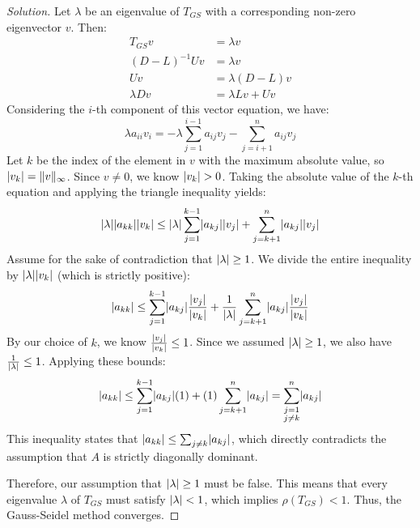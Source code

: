 \documentclass[11pt, a4paper]{article}
\DeclarePairedDelimiter\abs{\lvert}{\rvert}
\DeclarePairedDelimiter\norm{\lVert}{\rVert}
\newif\ifsolutionnewpage
\newenvironment{solution}
  {\begin{proof}[Solution]}
  {\end{proof}\ifsolutionnewpage\newpage\fi}
\begin{document}
\begin{solution}
    Let $\lambda$ be an eigenvalue of $T_{GS}$ with a corresponding non-zero eigenvector $v$. Then:
    \begin{align*}
        T_{GS} v &= \lambda v \\
        (D-L)^{-1}U v &= \lambda v \\
        U v &= \lambda(D-L) v \\
        \lambda D v &= \lambda L v + U v
    \end{align*}
    Considering the $i$-th component of this vector equation, we have:
    \[
    \lambda a_{ii} v_i = -\lambda \sum_{j=1}^{i-1} a_{ij} v_j - \sum_{j=i+1}^n a_{ij} v_j
    \]
    Let $k$ be the index of the element in $v$ with the maximum absolute value, so $\abs{v_k} = \norm{v}_\infty$. Since $v \neq 0$, we know $\abs{v_k} > 0$. Taking the absolute value of the $k$-th equation and applying the triangle inequality yields:
    \[
    \abs{\lambda} \abs{a_{kk}} \abs{v_k} \le \abs{\lambda} \sum_{j=1}^{k-1} \abs{a_{kj}} \abs{v_j} + \sum_{j=k+1}^n \abs{a_{kj}} \abs{v_j}
    \]
    Assume for the sake of contradiction that $\abs{\lambda} \ge 1$. We divide the entire inequality by $\abs{\lambda} \abs{v_k}$ (which is strictly positive):
    \[
    \abs{a_{kk}} \le \sum_{j=1}^{k-1} \abs{a_{kj}} \frac{\abs{v_j}}{\abs{v_k}} + \frac{1}{\abs{\lambda}} \sum_{j=k+1}^n \abs{a_{kj}} \frac{\abs{v_j}}{\abs{v_k}}
    \]
    By our choice of $k$, we know $\frac{\abs{v_j}}{\abs{v_k}} \le 1$. Since we assumed $\abs{\lambda} \ge 1$, we also have $\frac{1}{\abs{\lambda}} \le 1$. Applying these bounds:
    \[
    \abs{a_{kk}} \le \sum_{j=1}^{k-1} \abs{a_{kj}} (1) + (1) \sum_{j=k+1}^n \abs{a_{kj}} = \sum_{\substack{j=1 \\ j \neq k}}^n \abs{a_{kj}}
    \]
    This inequality states that $\abs{a_{kk}} \le \sum_{j \neq k} \abs{a_{kj}}$, which directly contradicts the assumption that $A$ is strictly diagonally dominant. 
    
    Therefore, our assumption that $\abs{\lambda} \ge 1$ must be false. This means that every eigenvalue $\lambda$ of $T_{GS}$ must satisfy $\abs{\lambda} < 1$, which implies $\rho(T_{GS}) < 1$. Thus, the Gauss-Seidel method converges.
\end{solution}
\end{document}
